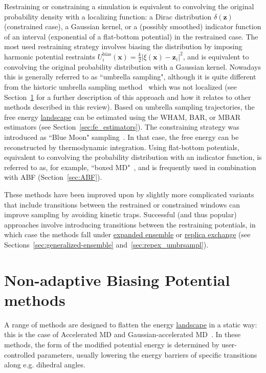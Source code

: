 \documentclass[9pt,review]{livecoms}
\newcommand{\vx}{\mathbf{x}}
\newcommand{\vz}{\mathbf{z}}
\begin{document}
Restraining or constraining a simulation is equivalent
to convolving the original probability density with a localizing function: a Dirac distribution $\delta(\vz)$ (constrained case),
a Gaussian kernel, or a (possibly smoothed) indicator function of an interval (exponential of a flat-bottom potential) in the restrained case.
The most used restraining strategy involves biasing the distribution by imposing harmonic potential restraints $U^{\mathrm{bias}}_i(\vx) = \frac{k}{2} |\xi(\vx)-\vz_i|^2$, and is equivalent to convolving the original probability distribution with a Gaussian kernel.
Nowadays this is generally referred to as ``umbrella sampling", although it is quite different from the historic umbrella sampling method~\cite{TORRIE1977187} which was not localized (see Section~\ref{sec:biasing_potential} for a further description of this approach and how it relates to other methods described in this review).
Based on umbrella sampling trajectories, the free energy \hyperlink{ref:FES} {landscape} can be estimated using the WHAM, BAR, or MBAR estimators (see Section~\ref{sec:fe_estimators}). The constraining strategy was introduced as ``Blue Moon" sampling~\cite{doi:10.1080/0892702042000270214}. In that case, the free energy can be reconstructed by thermodynamic integration. Using flat-bottom potentials, equivalent to convolving the probability distribution with an indicator function, is referred to as, for example, ``boxed MD"~\cite{doi:10.1021/jp9074898}, and is frequently used in combination with ABF (Section~\ref{sec:ABF}).

These methods have been improved upon by slightly more complicated variants that include transitions between the restrained or constrained windows can improve sampling by avoiding kinetic traps. Successful (and thus popular) approaches involve introducing transitions between the restraining potentials, in which case the methods fall under \hyperlink{ref:ExpEns} {expanded ensemble} or \hyperlink{ref:ReplEx} {replica exchange} (see Sections~\ref{sec:generalized-ensemble} and~\ref{sec:repex_umbrsampl}).


\section{Non-adaptive Biasing Potential methods}
\label{sec:biasing_potential}

A range of methods are designed to flatten the energy \hyperlink{ref:FES} {landscape} in a static way: this is the case of Accelerated MD\cite{Hamelberg2004} and Gaussian-accelerated MD~\cite{Miao2017, Wang2021}.
In these methods, the form of the modified potential energy is determined by user-controlled parameters, usually lowering the energy barriers of specific transitions along e.g. dihedral angles.
\end{document}
